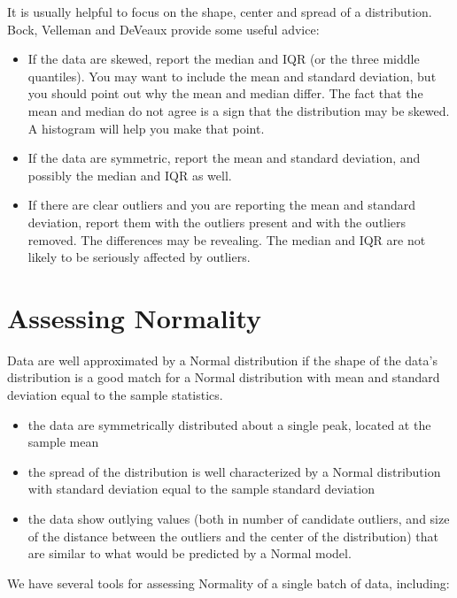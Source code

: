 \documentclass[
]{book}
\providecommand{\tightlist}{%
  \setlength{\itemsep}{0pt}\setlength{\parskip}{0pt}}
\begin{document}
It is usually helpful to focus on the shape, center and spread of a distribution. Bock, Velleman and DeVeaux provide some useful advice:

\begin{itemize}
\tightlist
\item
  If the data are skewed, report the median and IQR (or the three middle quantiles). You may want to include the mean and standard deviation, but you should point out why the mean and median differ. The fact that the mean and median do not agree is a sign that the distribution may be skewed. A histogram will help you make that point.
\item
  If the data are symmetric, report the mean and standard deviation, and possibly the median and IQR as well.
\item
  If there are clear outliers and you are reporting the mean and standard deviation, report them with the outliers present and with the outliers removed. The differences may be revealing. The median and IQR are not likely to be seriously affected by outliers.
\end{itemize}

\hypertarget{assessing-normality}{%
\chapter{Assessing Normality}\label{assessing-normality}}

Data are well approximated by a Normal distribution if the shape of the data's distribution is a good match for a Normal distribution with mean and standard deviation equal to the sample statistics.

\begin{itemize}
\tightlist
\item
  the data are symmetrically distributed about a single peak, located at the sample mean
\item
  the spread of the distribution is well characterized by a Normal distribution with standard deviation equal to the sample standard deviation
\item
  the data show outlying values (both in number of candidate outliers, and size of the distance between the outliers and the center of the distribution) that are similar to what would be predicted by a Normal model.
\end{itemize}

We have several tools for assessing Normality of a single batch of data, including:
\end{document}
